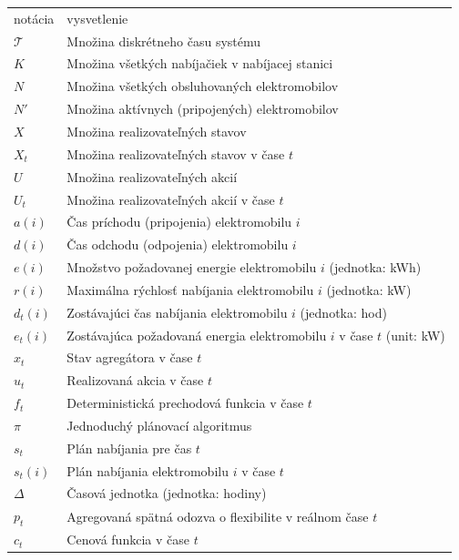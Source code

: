 \begin{table}[H]
    \begin{tabular}{ll}
    notácia & vysvetlenie \\
    $\mathcal{T}$  & Množina diskrétneho času systému \\
    $K$  & Množina všetkých nabíjačiek v nabíjacej stanici   \\
    $N$  & Množina všetkých obsluhovaných elektromobilov   \\
    $N'$  & Množina aktívnych (pripojených) elektromobilov  \\
    $X$  & Množina realizovateľných stavov    \\
    $X_{t}$  & Množina realizovateľných stavov v čase $t$   \\
    $U$  & Množina realizovateľných akcií  \\
    $U_{t}$  & Množina realizovateľných akcií v čase $t$   \\
    $a(i)$ & Čas príchodu (pripojenia) elektromobilu $i$  \\
    $d(i)$ & Čas odchodu (odpojenia) elektromobilu $i$  \\
    $e(i)$ & Množstvo požadovanej energie elektromobilu $i$ (jednotka: kWh) \\
    $r(i)$ & Maximálna rýchlosť nabíjania elektromobilu $i$ (jednotka: kW) \\
    $d_{t}(i)$ & Zostávajúci čas nabíjania elektromobilu $i$ (jednotka: hod) \\
    $e_{t}(i)$ & Zostávajúca požadovaná energia elektromobilu $i$ v čase $t$ (unit: kW)    \\
    $x_{t}$ & Stav agregátora v čase $t$    \\
    $u_{t}$ & Realizovaná akcia v čase $t$  \\
    $f_{t}$ & Deterministická prechodová funkcia v čase $t$ \\
    $\pi$ & Jednoduchý plánovací algoritmus \\
    $s_{t}$ & Plán nabíjania pre čas $t$   \\
    $s_{t}(i)$ & Plán nabíjania elektromobilu $i$ v čase $t$   \\
    $\Delta$ & Časová jednotka (jednotka: hodiny) \\
    $p_{t}$ & Agregovaná spätná odozva o flexibilite v reálnom čase $t$  \\
    $c_{t}$ & Cenová funkcia v čase $t$   \\

\end{tabular}
\end{table}
